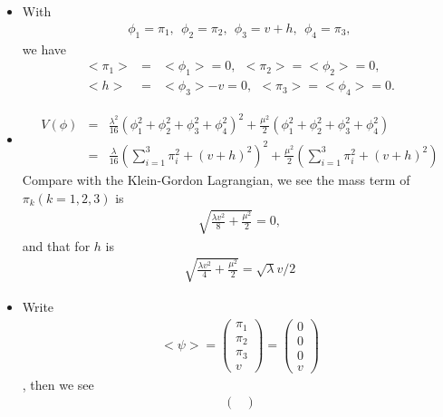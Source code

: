 \documentclass[11pt]{article}
\begin{document}
\section{ }
\begin{itemize}
    \item With 
    \begin{eqnarray}
        \phi_1 = \pi_1,~~\phi_2 = \pi_2,~~\phi_3 = v + h,~~\phi_4 = \pi_3,
    \end{eqnarray}
    we have
    \begin{eqnarray}
        <\pi_1> &=& <\phi_1> = 0 ,~~<\pi_2>= <\phi_2> = 0,\\
       <h> &=& <\phi_3> - v =0 ,~~< \pi_3>=<\phi_4> =0.
    \end{eqnarray}
    \item 
    \begin{eqnarray}
        V(\phi)&=&\frac{\lambda^2}{16}(\phi_1^2+\phi_2^2+\phi_3^2+\phi_4^2)^2+\frac{\mu^2}{2}(\phi_1^2+\phi_2^2+\phi_3^2+\phi_4^2) \\
        &=&\frac{\lambda}{16}(\sum_{i=1}^3 \pi_i^2+(v+h)^2)^2+\frac{\mu^2}{2} (\sum_{i=1}^3 \pi_i^2+(v+h)^2)
    \end{eqnarray} 
    Compare with the Klein-Gordon Lagrangian, we see the mass term of $\pi_k (k=1,2,3)$ is 
    \begin{eqnarray}
        \sqrt{\frac{\lambda v^2}{8}+\frac{\mu^2}{2}}=0,
    \end{eqnarray}
    and that for $h$ is
    \begin{eqnarray}
        \sqrt{\frac{\lambda v^2}{4}+\frac{\mu^2}{2}}=\sqrt{\lambda} v/2
    \end{eqnarray}
    \item Write
    \begin{eqnarray}
        <\psi>=
        \begin{pmatrix}
            \pi_1\\\pi_2\\\pi_3\\v
        \end{pmatrix}
        =
        \begin{pmatrix}
            0\\0\\0\\v
        \end{pmatrix}
    \end{eqnarray},
    then we see
    \begin{eqnarray}
        \begin{pmatrix}

\end{pmatrix}
\end{eqnarray}
\end{itemize}
\end{document}

